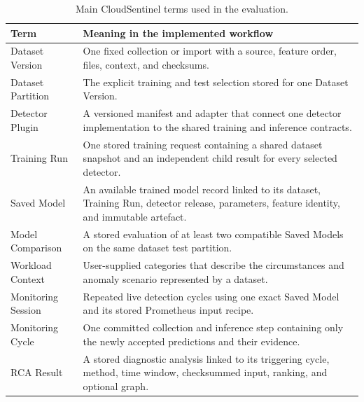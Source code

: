 \begin{table}[H]
    \centering
    \caption{Main CloudSentinel terms used in the evaluation.}
    \label{tab:evaluation_terms}
    \begin{tabularx}{\linewidth}{@{}p{34mm}X@{}}
        \toprule
        \textbf{Term} & \textbf{Meaning in the implemented workflow} \\
        \midrule
        Dataset Version & One fixed collection or import with a source, feature order, files, context, and checksums. \\
        Dataset Partition & The explicit training and test selection stored for one Dataset Version. \\
        Detector Plugin & A versioned manifest and adapter that connect one detector implementation to the shared training and inference contracts. \\
        Training Run & One stored training request containing a shared dataset snapshot and an independent child result for every selected detector. \\
        Saved Model & An available trained model record linked to its dataset, Training Run, detector release, parameters, feature identity, and immutable artefact. \\
        Model Comparison & A stored evaluation of at least two compatible Saved Models on the same dataset test partition. \\
        Workload Context & User-supplied categories that describe the circumstances and anomaly scenario represented by a dataset. \\
        Monitoring Session & Repeated live detection cycles using one exact Saved Model and its stored Prometheus input recipe. \\
        Monitoring Cycle & One committed collection and inference step containing only the newly accepted predictions and their evidence. \\
        RCA Result & A stored diagnostic analysis linked to its triggering cycle, method, time window, checksummed input, ranking, and optional graph. \\
        \bottomrule
    \end{tabularx}
\end{table}

